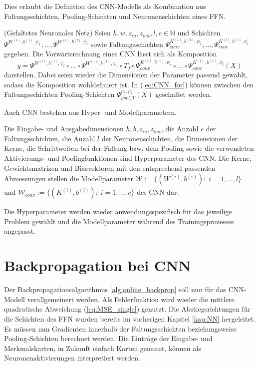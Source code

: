 Dies erlaubt die Definition des CNN-Modells als Kombination aus Faltungsschichten, Pooling-Schichten und Neuronenschichten eines FFN.
\begin{defi}(Gefaltetes Neuronales Netz)
    \label{def_fw_cnn}
    Seien $h, w, z_{in}, z_{out}, l ,c \in \mathbb{N}$ und Schichten $\Psi^{W^{(1)},b^{(1)},\psi_{1}}, \ldots, \Psi^{W^{(l)},b^{(l)},\psi_{l}}$ sowie Faltungsschichten $\Psi_{conv}^{K^{(1)},b^{(1)},\psi_{1}}, \ldots, \Psi_{conv}^{K^{(l)},b^{(l)},\psi_{l}}$ gegeben. Die Vorwärtsrechnung eines CNN lässt sich als Komposition
    \begin{equation}
        \label{eq:CNN_for}
        y=\Psi^{W^{(l)},b^{(l)},\psi_{l}} \circ \ldots \circ \Psi^{W^{(1)},b^{(1)},\psi_{1}} \circ T_f \circ \Psi_{conv}^{K^{(c)},b^{(c)},\psi_{c}} \circ \ldots \circ \Psi_{conv}^{K^{(1)},b^{(1)},\psi_{l}}(X)
    \end{equation} 
    darstellen. Dabei seien wieder die Dimensionen der Parameter passend gewählt, sodass die Komposition wohldefiniert ist. In (\ref{eq:CNN_for}) können zwischen den Faltungsschichten Pooling-Schichten $\Psi_{pool,T}^{p_h,p_b}(X)$ geschaltet werden.
\end{defi}
Auch CNN bestehen aus Hyper- und Modellparametern.

\begin{defi}
    Die Eingabe- und Ausgabedimensionen $h, b, z_{in}, z_{out}$, die Anzahl $c$ der Faltungsschichten, die Anzahl $l$ der Neuronenschichten, die Dimensionen der Kerne, die Schrittweiten bei der Faltung bzw. dem Pooling sowie die verwendeten Aktivierungs- und Poolingfunktionen sind Hyperparameter des CNN.
    Die Kerne, Gewichtsmatrizen und Biasvektoren mit den entsprechend passenden Abmessungen stellen die Modellparameter $\mathcal{W}:=\{(W^{(i)},b^{(i)}): \; i=1, \ldots, l\}$ und $\mathcal{W}_{conv}:=\{(K^{(i)}, b^{(i)}): \; i=1, \ldots, c\}$ des CNN dar. 
\end{defi}
Die Hyperparameter werden wieder anwendungsspezifisch für das jeweilige Problem gewählt und die Modellparameter während des Trainingsprozesses angepasst. 

\section{Backpropagation bei CNN}
\label{abs:CNN_train}
Der Backpropagationsalgorithmus \ref{alg:online_backprop} soll nun für das CNN-Modell verallgemeinert werden. 
Als Fehlerfunktion wird wieder die mittlere quadratische Abweichung (\ref{eq:MSE_single})
genutzt. 
Die Abstiegsrichtungen für die Schichten des FFN wurden bereits im vorherigen Kapitel \ref{kap:NN} hergeleitet. Es müssen nun Gradienten innerhalb der Faltungsschichten beziehungsweise Pooling-Schichten berechnet werden. Die Einträge der Eingabe- und Merkmalskarten, in Zukunft einfach Karten genannt, können als Neuronenaktivierungen interpretiert werden. 

